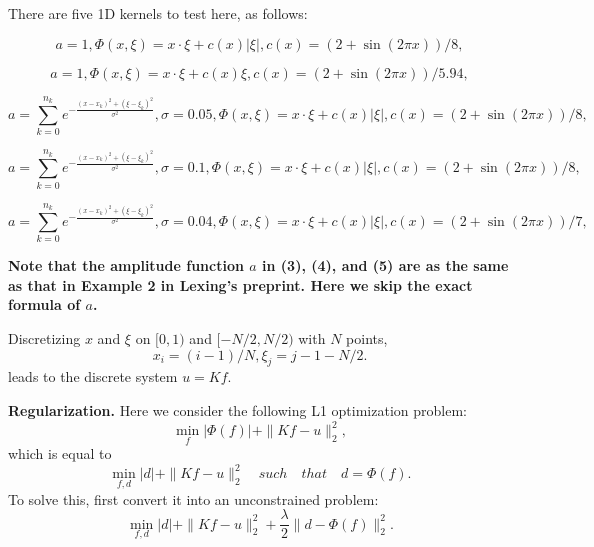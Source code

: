 \documentclass[11pt]{article}
\begin{document}
There are five 1D kernels to test here, as follows:

\begin{equation}
a = 1, \Phi(x,\xi) = x\cdot\xi + c(x)|\xi|, c(x) = (2+\sin(2\pi x))/8,
\end{equation}

\begin{equation}
a = 1, \Phi(x,\xi) = x\cdot\xi + c(x)\xi, c(x) = (2+\sin(2\pi x))/5.94,
\end{equation}

\begin{equation}
a = \sum\limits_{k=0}^{n_{k}} e^{-\frac{(x-x_{k})^2 + (\xi-\xi_{k})^2}{\sigma^2}}, \sigma = 0.05, \Phi(x,\xi) = x\cdot\xi + c(x)|\xi|, c(x) = (2+\sin(2\pi x))/8,
\end{equation}

\begin{equation}
a = \sum\limits_{k=0}^{n_{k}} e^{-\frac{(x-x_{k})^2 + (\xi-\xi_{k})^2}{\sigma^2}}, \sigma = 0.1, \Phi(x,\xi) = x\cdot\xi + c(x)|\xi|, c(x) = (2+\sin(2\pi x))/8,
\end{equation}

\begin{equation}
a = \sum\limits_{k=0}^{n_{k}} e^{-\frac{(x-x_{k})^2 + (\xi-\xi_{k})^2}{\sigma^2}}, \sigma = 0.04, \Phi(x,\xi) = x\cdot\xi + c(x)|\xi|, c(x) = (2+\sin(2\pi x))/7,
\end{equation}


\textbf{Note that the amplitude function $a$ in (3), (4), and (5) are as the same as that in Example 2 in Lexing's preprint. Here we skip the exact formula of $a$.}

Discretizing $x$ and $\xi$ on $[0,1)$ and $[-N/2, N/2)$ with $N$ points,
\begin{equation*}
x_{i} = (i-1)/N, \xi_{j} = j-1-N/2.
\end{equation*}
leads to the discrete system $u = Kf$.

\textbf{Regularization.} Here we consider the following L1 optimization problem:
\begin{equation*}
\min\limits_{f} |\Phi(f)| + \|Kf-u\|_{2}^{2},
\end{equation*}
which is equal to 
\begin{equation*}
\min\limits_{f,d} |d| + \|Kf-u\|_{2}^{2} \quad such \quad that \quad d = \Phi(f).
\end{equation*}
To solve this, first convert it into an unconstrained problem:
\begin{equation*}
\min\limits_{f,d} |d| + \|Kf-u\|_{2}^{2} + \frac{\lambda}{2}\|d - \Phi(f)\|_{2}^{2}.
\end{equation*}
\end{document}
